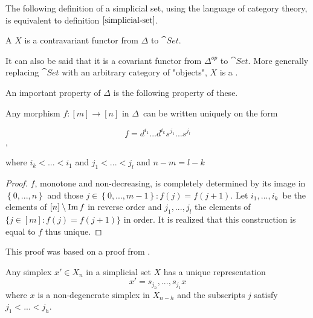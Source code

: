 \documentclass[../../main.tex]{subfiles}
\begin{document}
    The following definition of a simplicial set, using the language of category theory, is equivalent to definition $\ref{simplicial-set}$.

    \begin{definition}
        A  $X$ is a contravariant functor from $\Delta$ to $\cat{Set}$.
    \end{definition}

    It can also be said that it is a covariant functor from $\Delta^{op}$ to $\cat{Set}$. More generally replacing $\cat{Set}$ with an arbitrary category of "objects", $X$ is a . 
    
    An important property of $\Delta$ is the following property of these.

    \begin{proposition}\label{uni-fun}
        Any morphism $f: [m] \to [n]$ in $\Delta$ can be written uniquely on the form

        \begin{equation*}
            f = d^{i_1}...d^{i_k}s^{j_1}...s^{j_l}
        \end{equation*},

        where $i_k < ... < i_1$ and $j_1 < ... < j_l$ and $n - m = l - k$
    \end{proposition}

    \begin{proof}
        $f$, monotone and non-decreasing, is completely determined by its image in $\left\{ 0,...,n \right\}$ and those $j\in \left\{0,...,m-1 \right\}:f(j) = f(j+1)$. Let $i_1, ..., i_k$ be the elements of $[n] \setminus \operatorname{Im} f$ in reverse order and $j_1, ..., j_l$ the elements of $\{j \in [m]: f(j) = f(j+1)\}$ in order. It is realized that this construction is equal to $f$ thus unique.
    \end{proof}

    This proof was based on a proof from \cite{simp-may}.

    \begin{corollary}\label{uni-sim}
        Any simplex $x' \in X_n$ in a simplicial set $X$ has a unique representation
        \[x' = s_{j_h},...,s_{j_1}x\]
        where $x$ is a non-degenerate simplex in $X_{n-h}$ and the subscripts $j$ satisfy $j_1 < ... < j_h$.
    \end{corollary}
    
\end{document}
